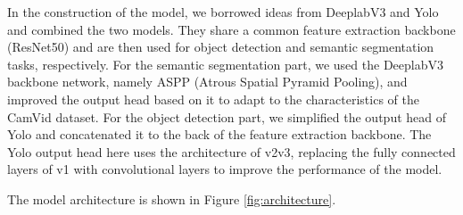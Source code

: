 \documentclass[conference]{IEEEtran}
\begin{document}
In the construction of the model, we borrowed ideas from DeeplabV3 and Yolo and combined the two models. They share a common feature extraction backbone (ResNet50) and are then used for object detection and semantic segmentation tasks, respectively. For the semantic segmentation part, we used the DeeplabV3 backbone network, namely ASPP (Atrous Spatial Pyramid Pooling), and improved the output head based on it to adapt to the characteristics of the CamVid dataset. For the object detection part, we simplified the output head of Yolo and concatenated it to the back of the feature extraction backbone. The Yolo output head here uses the architecture of v2v3, replacing the fully connected layers of v1 with convolutional layers to improve the performance of the model.

The model architecture is shown in Figure \ref{fig:architecture}.
\end{document}
